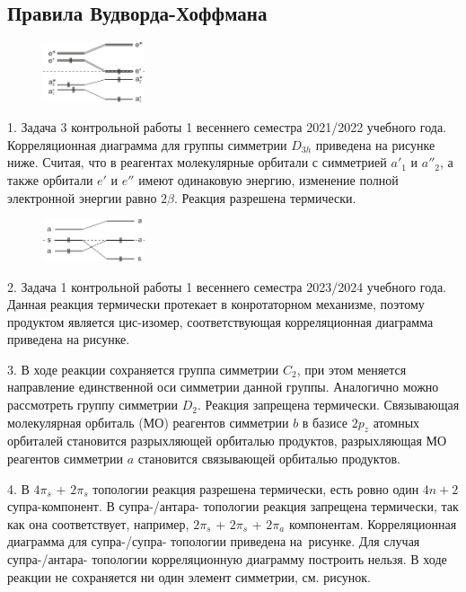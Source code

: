 \subsection{Правила Вудворда-Хоффмана}
\begin{figure} %
    \centering
    \vspace{1.8mm}
    \includegraphics[width=30mm]{images/Fig_2_1_1_dec.png}
    \vspace{-5mm}
\end{figure}
1. Задача 3 контрольной работы 1 весеннего семестра 2021/2022 учебного года. Корреляционная диаграмма для группы симметрии $D_{3h}$ приведена на рисунке ниже.  Считая, что в реагентах молекулярные орбитали с симметрией $a'_1$ и $a''_2$, а также орбитали $e'$ и $e''$ имеют одинаковую энергию, изменение полной электронной энергии равно $2\beta$. Реакция разрешена термически.\par
\begin{figure} %
    \centering
    \vspace{-2.2mm}
    \includegraphics[width=30mm]{images/Fig_2_1_2_dec.png}
    \vspace{-5mm}
\end{figure}
2. Задача 1 контрольной работы 1 весеннего семестра 2023/2024 учебного года. Данная реакция термически протекает в конротаторном механизме, поэтому продуктом является цис-изомер, соответствующая корреляционная диаграмма приведена на рисунке.\par
3. В ходе реакции сохраняется группа симметрии $C_2$, при этом меняется направление единственной оси симметрии данной группы. Аналогично можно рассмотреть группу симметрии $D_2$. Реакция запрещена термически. Связывающая молекулярная орбиталь (МО) реагентов симметрии $b$ в базисе $2p_z$ атомных орбиталей становится разрыхляющей орбиталью продуктов, разрыхляющая МО реагентов симметрии $a$ становится связывающей орбиталью продуктов.\par
4. В $4\pi_s$ + $2\pi_s$ топологии реакция разрешена термически, есть ровно один $4n+2$ супра-компонент. В супра-/антара- топологии реакция запрещена термически, так как она соответствует, например, $2\pi_s$ + $2\pi_s$ + $2\pi_a$ компонентам. Корреляционная диаграмма для супра-/супра- топологии приведена на~рисунке. Для случая супра-/антара- топологии корреляционную диаграмму построить нельзя. В ходе реакции не сохраняется ни один элемент симметрии, см. рисунок.\par

